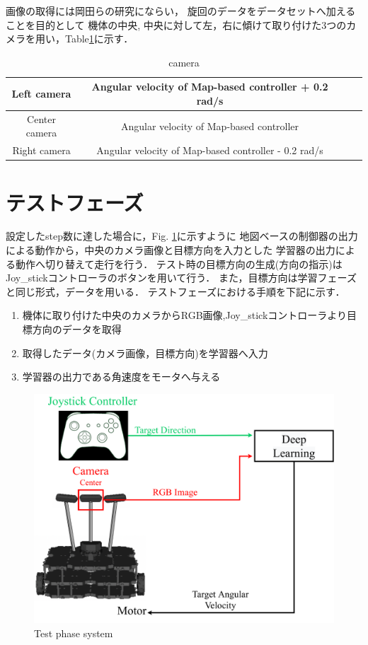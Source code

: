 \newpage
画像の取得には岡田らの研究\cite{okada}にならい，
旋回のデータをデータセットへ加えることを目的として
機体の中央, 中央に対して左，右に傾けて取り付けた3つのカメラを用い，Table\ref{tb::camera_ang}に示す．
\begin{table}[H]
  \centering
  \caption{camera }
  \begin{tabular}{|c|c|ll}
  \hline
  Left camera   & Angular velocity of Map-based controller + 0.2 rad/s \\ \hline
  Center camera & Angular velocity of Map-based controller             \\ \hline
  Right camera  & Angular velocity of Map-based controller - 0.2 rad/s  \\ \hline
  \end{tabular}
  \label{tb::camera_ang}
  \end{table}

\newpage
\section{テストフェーズ}
\label{test}
設定したstep数に達した場合に，Fig. \ref{fig::testsystem}に示すように
地図ベースの制御器の出力による動作から，中央のカメラ画像と目標方向を入力とした
学習器の出力による動作へ切り替えて走行を行う．
テスト時の目標方向の生成(方向の指示)はJoy\_stickコントローラのボタンを用いて行う．
また，目標方向は学習フェーズと同じ形式，データを用いる．
テストフェーズにおける手順を下記に示す．
\begin{enumerate}
    \item 機体に取り付けた中央のカメラからRGB画像,Joy\_stickコントローラより目標方向のデータを取得
    \item 取得したデータ(カメラ画像，目標方向)を学習器へ入力
    \item 学習器の出力である角速度をモータへ与える
  \end{enumerate}


\begin{figure}[h]
    \centering
    \includegraphics[width = 12cm]{./figs/system_test.pdf}
    \caption{Test phase system}
    \label{fig::testsystem}
\end{figure}

